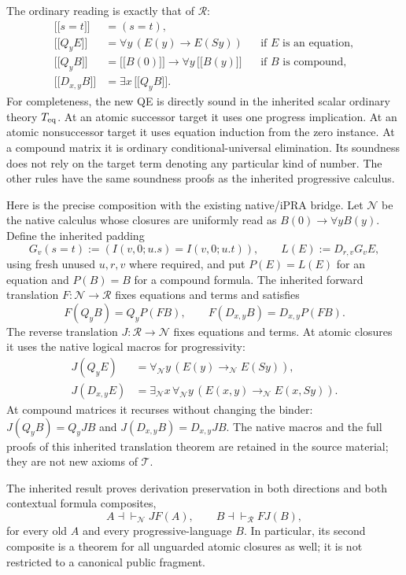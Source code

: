 \documentclass[11pt,a4paper]{article}
\theoremstyle{definition}\newtheorem{definition}[theorem]{Definition}
\newcommand{\llbracket}{\mathopen{[\![}}
\newcommand{\rrbracket}{\mathclose{]\!]}}
\begin{document}
The ordinary reading is exactly that of $\mathcal R$:
\[
 \begin{aligned}
 \llbracket s=t\rrbracket&=(s=t),\\
 \llbracket Q_yE\rrbracket
   &=\forall y\,(E(y)\to E(Sy))&&\text{if $E$ is an equation},\\
 \llbracket Q_yB\rrbracket
   &=\llbracket B(0)\rrbracket\to\forall y\,\llbracket B(y)\rrbracket
      &&\text{if $B$ is compound},\\
 \llbracket D_{x,y}B\rrbracket&=\exists x\,\llbracket Q_yB\rrbracket.
 \end{aligned}
\]
For completeness, the new QE is directly sound in the inherited scalar
ordinary theory $T_{\rm eq}$.  At an atomic successor target it uses one
progress implication.  At an atomic nonsuccessor target it uses equation
induction from the zero instance.  At a compound matrix it is ordinary
conditional-universal elimination.  Its soundness does not rely on the
target term denoting any particular kind of number.  The other rules have
the same soundness proofs as the inherited progressive calculus.

Here is the precise composition with the existing native/iPRA bridge.
Let $\mathcal N$ be the native calculus whose closures are uniformly read
as $B(0)\to\forall yB(y)$.  Define the inherited padding
\[
 G_v(s=t):=(I(v,0;u.s)=I(v,0;u.t)),\qquad
 L(E):=D_{r,v}G_vE,
\]
using fresh unused $u,r,v$ where required, and put $P(E)=L(E)$ for an
equation and $P(B)=B$ for a compound formula.  The inherited forward
translation $F:\mathcal N\to\mathcal R$ fixes equations and terms and
satisfies
\[
 F(Q_yB)=Q_yP(FB),\qquad F(D_{x,y}B)=D_{x,y}P(FB).
\]
The reverse translation $J:\mathcal R\to\mathcal N$ fixes equations and
terms.  At atomic closures it uses the native logical macros for
progressivity:
\[
 \begin{aligned}
 J(Q_yE)&=\forall_{\mathcal N}y\,
                    (E(y)\to_{\mathcal N}E(Sy)),\\
 J(D_{x,y}E)&=\exists_{\mathcal N}x\,\forall_{\mathcal N}y\,
                    (E(x,y)\to_{\mathcal N}E(x,Sy)).
 \end{aligned}
\]
At compound matrices it recurses without changing the binder:
$J(Q_yB)=Q_yJB$ and $J(D_{x,y}B)=D_{x,y}JB$.
The native macros and the full proofs of this inherited translation theorem
are retained in the source material; they are not new axioms of $\mathcal T$.

The inherited result\cite{uniform} proves derivation preservation in both directions and
both contextual formula composites,
\[
 A\dashv\vdash_{\mathcal N}JF(A),\qquad
 B\dashv\vdash_{\mathcal R}FJ(B),
\]
for every old $A$ and every progressive-language $B$.  In particular, its
second composite is a theorem for all unguarded atomic closures as well;
it is not restricted to a canonical public fragment.
\end{document}
